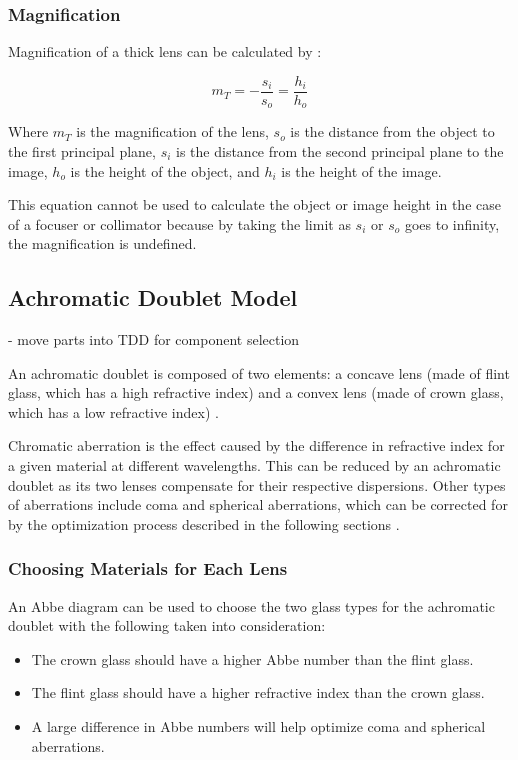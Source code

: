 \subsubsection{Magnification}

Magnification of a thick lens can be calculated by \cite{Jones2013}:

\begin{equation}
    m_T = -\frac{s_i}{s_o} = \frac{h_i}{h_o}
\end{equation}

Where $m_T$ is the magnification of the lens, $s_o$ is the distance from the object to the first principal plane, $s_i$ is the distance from the second principal plane to the image, $h_o$ is the height of the object, and $h_i$ is the height of the image.

This equation cannot be used to calculate the object or image height in the case of a focuser or collimator because by taking the limit as $s_i$ or $s_o$ goes to infinity, the magnification is undefined. 

\subsection{Achromatic Doublet Model} - move parts into TDD for component selection 

An achromatic doublet is composed of two elements: a concave lens (made of flint glass, which has a high refractive index) and a convex lens (made of crown glass, which has a low refractive index) \cite{EdmundOptics}.

Chromatic aberration is the effect caused by the difference in refractive index for a given material at different wavelengths. This can be reduced by an achromatic doublet as its two lenses compensate for their respective dispersions. Other types of aberrations include coma and spherical aberrations, which can be corrected for by the optimization process described in the following sections \cite{Opticsforhire}.

\subsubsection{Choosing Materials for Each Lens}

An Abbe diagram can be used to choose the two glass types for the achromatic doublet with the following taken into consideration:

\begin{itemize}
    \item The crown glass should have a higher Abbe number than the flint glass.
    \item The flint glass should have a higher refractive index than the crown glass.
    \item A large difference in Abbe numbers will help optimize coma and spherical aberrations.
\end{itemize}

